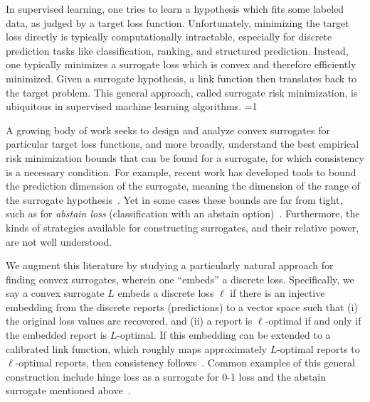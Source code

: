 \documentclass[11pt]{article}
\newcommand{\Comments}{1}
\newcommand{\mytodo}[2]{\ifnum\Comments=1%
  \todo[linecolor=#1!80!black,backgroundcolor=#1,bordercolor=#1!80!black]{#2}\fi}
\newcommand{\raft}[1]{\mytodo{green!20!white}{RF: #1}}
\begin{document}
In supervised learning, one tries to learn a hypothesis which fits some labeled data, as judged by a target loss function.
Unfortunately, minimizing the target loss directly is typically computationally intractable, especially for discrete prediction tasks like classification, ranking, and structured prediction.
Instead, one typically minimizes a surrogate loss which is convex and therefore efficiently minimized.
Given a surrogate hypothesis, a link function then translates back to the target problem.
This general approach, called surrogate risk minimization, is ubiquitous in supervised machine learning algorithms.
\raft{Bo: see if this is more accessible now}

A growing body of work seeks to design and analyze convex surrogates for particular target loss functions, and more broadly, understand the best empirical risk minimization bounds that can be found for a surrogate, for which consistency is a necessary condition.
For example, recent work has developed tools to bound the prediction dimension of the surrogate, meaning the dimension of the range of the surrogate hypothesis~\cite{frongillo2015elicitation,  ramaswamy2016convex}.
Yet in some cases these bounds are far from tight, such as for \emph{abstain loss} (classification with an abstain option)~\citep{bartlett2008classification,yuan2010classification,ramaswamy2016convex,ramaswamy2018consistent,zhang2018reject}.
Furthermore, the kinds of strategies available for constructing surrogates, and their relative power, are not well understood.

We augment this literature by studying a particularly natural approach for finding convex surrogates, wherein one ``embeds'' a discrete loss.
Specifically, we say a convex surrogate $L$ embeds a discrete loss $\ell$ if there is an injective embedding from the discrete reports (predictions) to a vector space such that (i) the original loss values are recovered, and (ii) a report is $\ell$-optimal if and only if the embedded report is $L$-optimal.
If this embedding can be extended to a calibrated link function, which roughly maps approximately $L$-optimal reports to $\ell$-optimal reports, then consistency follows~\citep{agarwal2015consistent}.
Common examples of this general construction include hinge loss as a surrogate for 0-1 loss and the abstain surrogate mentioned above~\citep{ramaswamy2018consistent}.
\end{document}
